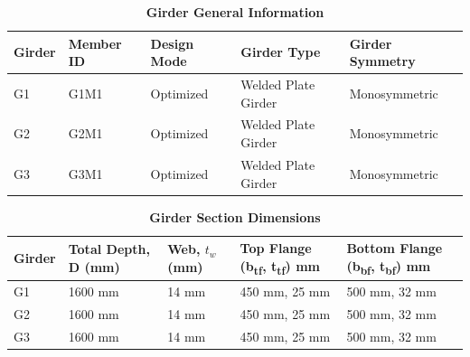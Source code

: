\documentclass[12pt,a4paper]{report}
\numberwithin{table}{chapter}
\numberwithin{figure}{chapter}
\begin{document}
\newpage

\vspace{0.4em}
\noindent
            
\vspace{4pt}
\begin{longtable}{|L{2.2cm}|L{1.8cm}|p{3.8cm}|p{3.8cm}|p{3.8cm}|}
\caption{\textbf{Girder General Information}}
\hline
\textbf{Girder} & \textbf{Member ID} & \textbf{Design Mode} & \textbf{Girder Type} & \textbf{Girder Symmetry} \\[6pt]
\hline
G1 & G1M1 & Optimized & Welded Plate Girder & Monosymmetric \\[8pt]
\hline
G2 & G2M1 & Optimized & Welded Plate Girder & Monosymmetric \\[8pt]
\hline
G3 & G3M1 & Optimized & Welded Plate Girder & Monosymmetric \\[8pt]
\hline
\end{longtable}

\vspace{0.6em}

\vspace{4pt}
\begin{longtable}{|L{1.8cm}|L{2.3cm}|L{1.8cm}|p{4.8cm}|p{4.8cm}|}
\caption{\textbf{Girder Section Dimensions}}
\hline
\textbf{Girder} & \textbf{Total Depth, D (mm)} & \textbf{Web, $t_w$ (mm)} & \textbf{Top Flange (b\textsubscript{tf}, t\textsubscript{tf}) mm} & \textbf{Bottom Flange (b\textsubscript{bf}, t\textsubscript{bf}) mm} \\[6pt]
\hline
G1 & 1600 mm & 14 mm & 450 mm, 25 mm & 500 mm, 32 mm \\[8pt]
\hline
G2 & 1600 mm & 14 mm & 450 mm, 25 mm & 500 mm, 32 mm \\[8pt]
\hline
G3 & 1600 mm & 14 mm & 450 mm, 25 mm & 500 mm, 32 mm \\[8pt]
\hline
\end{longtable}

\vspace{0.6em}
\end{document}
